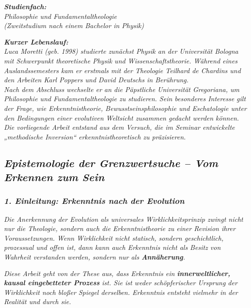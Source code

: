 \documentclass[
]{article}
\begin{document}
\emph{\textbf{Studienfach:\\
}Philosophie und Fundamentaltheologie\\
(Zweitstudium nach einem Bachelor in Physik)}

\emph{\textbf{Kurzer Lebenslauf:\\
}Luca Moretti (geb. 1998) studierte zunächst Physik an der Universität Bologna mit Schwerpunkt theoretische Physik und Wissenschaftstheorie. Während eines Auslandssemesters kam er erstmals mit der Theologie Teilhard de Chardins und den Arbeiten Karl Poppers und David Deutschs in Berührung.\\
Nach dem Abschluss wechselte er an die Päpstliche Universität Gregoriana, um Philosophie und Fundamentaltheologie zu studieren. Sein besonderes Interesse gilt der Frage, wie Erkenntnistheorie, Bewusstseinsphilosophie und Eschatologie unter den Bedingungen einer evolutiven Weltsicht zusammen gedacht werden können.\\
Die vorliegende Arbeit entstand aus dem Versuch, die im Seminar entwickelte „methodische Inversion`` erkenntnistheoretisch zu präzisieren.}

\subsection{\texorpdfstring{\emph{\textbf{Epistemologie der Grenzwertsuche -- Vom Erkennen zum Sein}}}{Epistemologie der Grenzwertsuche -- Vom Erkennen zum Sein}}\label{epistemologie-der-grenzwertsuche-vom-erkennen-zum-sein}

\subsubsection{\texorpdfstring{\emph{\textbf{1. Einleitung: Erkenntnis nach der Evolution}}}{1. Einleitung: Erkenntnis nach der Evolution}}\label{einleitung-erkenntnis-nach-der-evolution}

\emph{Die Anerkennung der Evolution als universales Wirklichkeitsprinzip zwingt nicht nur die Theologie, sondern auch die Erkenntnistheorie zu einer Revision ihrer Voraussetzungen. Wenn Wirklichkeit nicht statisch, sondern geschichtlich, prozessual und offen ist, dann kann auch Erkenntnis nicht als Besitz von Wahrheit verstanden werden, sondern nur als \textbf{Annäherung}.}

\emph{Diese Arbeit geht von der These aus, dass Erkenntnis ein \textbf{innerweltlicher, kausal eingebetteter Prozess} ist. Sie ist weder schöpferischer Ursprung der Wirklichkeit noch bloßer Spiegel derselben. Erkenntnis entsteht vielmehr in der Realität und durch sie.}
\end{document}
